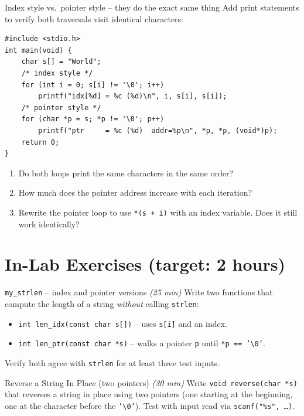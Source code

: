 \documentclass[11pt]{article}
\begin{document}
\begin{tryit}{Index style vs.\ pointer style -- they do the exact same thing}
Add print statements to verify both traversals visit identical characters:
\begin{lstlisting}
#include <stdio.h>
int main(void) {
    char s[] = "World";
    /* index style */
    for (int i = 0; s[i] != '\0'; i++)
        printf("idx[%d] = %c (%d)\n", i, s[i], s[i]);
    /* pointer style */
    for (char *p = s; *p != '\0'; p++)
        printf("ptr     = %c (%d)  addr=%p\n", *p, *p, (void*)p);
    return 0;
}
\end{lstlisting}
\begin{enumerate}[nosep,leftmargin=*]
  \item Do both loops print the same characters in the same order?
  \item How much does the pointer address increase with each iteration?
  \item Rewrite the pointer loop to use \texttt{*(s + i)} with an index variable.
        Does it still work identically?
\end{enumerate}
\end{tryit}

\section*{In-Lab Exercises (target: 2 hours)}

\begin{labexercise}{\texttt{my\_strlen} -- index and pointer versions \hfill {\small \itshape (25 min)}}
Write two functions that compute the length of a string \emph{without} calling \texttt{strlen}:
\begin{itemize}[leftmargin=*,nosep]
  \item \texttt{int len\_idx(const char s[])} -- uses \texttt{s[i]} and an index.
  \item \texttt{int len\_ptr(const char *s)} -- walks a pointer \texttt{p} until \texttt{*p == '\textbackslash 0'}.
\end{itemize}
Verify both agree with \texttt{strlen} for at least three test inputs.
\end{labexercise}

\begin{labexercise}{Reverse a String In Place (two pointers) \hfill {\small \itshape (30 min)}}
Write \texttt{void reverse(char *s)} that reverses a string in place using two pointers
(one starting at the beginning, one at the character before the \texttt{'\textbackslash 0'}).
Test with input read via \texttt{scanf("\%s", \dots)}.
\end{labexercise}
\end{document}
